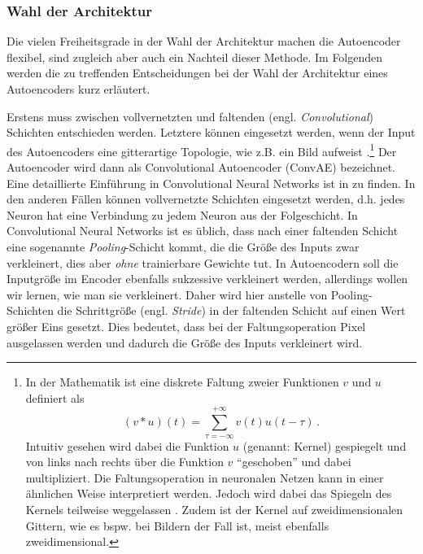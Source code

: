 \subsubsection{Wahl der Architektur}
\label{ch:MethodenDerDimRed:ML:AE:WahlArchitektur}

Die vielen Freiheitsgrade in der Wahl der Architektur machen die Autoencoder flexibel, sind
zugleich aber auch ein Nachteil dieser Methode. Im Folgenden werden die zu treffenden
Entscheidungen bei der Wahl der Architektur eines Autoencoders kurz erläutert.

Erstens muss zwischen vollvernetzten und faltenden (engl. \textit{Convolutional}) Schichten
entschieden werden. Letztere können eingesetzt werden, wenn der Input des Autoencoders eine
gitterartige Topologie, wie z.B. ein Bild aufweist \parencite[330]{Goodfellow.2016}.\footnote{In der Mathematik ist eine diskrete Faltung zweier
	Funktionen $v$ und $u$ definiert als
	\begin{equation*}
		(v * u)(t) = \sum_{\tau = -\infty}^{+\infty} v(t)u(t - \tau) \, .
	\end{equation*}
	Intuitiv gesehen wird dabei die Funktion $u$ (genannt: Kernel) gespiegelt und von links nach rechts über die Funktion $v$ \enquote{geschoben} und dabei multipliziert. Die Faltungsoperation in neuronalen Netzen kann in einer ähnlichen Weise interpretiert werden. Jedoch wird dabei das Spiegeln des Kernels teilweise weggelassen \parencite[333]{Goodfellow.2016}. Zudem ist der Kernel auf zweidimensionalen Gittern, wie es bspw. bei
	Bildern der Fall ist, meist ebenfalls zweidimensional.} Der Autoencoder wird dann als Convolutional
Autoencoder (ConvAE) bezeichnet. Eine detaillierte Einführung in Convolutional Neural Networks ist
in \textcite[330 -- 372]{Goodfellow.2016} zu finden. In den anderen Fällen können vollvernetzte
Schichten eingesetzt werden, d.h. jedes Neuron hat eine Verbindung zu jedem Neuron aus der
Folgeschicht. In Convolutional Neural Networks ist es üblich, dass nach einer faltenden Schicht
eine sogenannte \textit{Pooling}-Schicht \parencite[339 -- 345]{Goodfellow.2016} kommt, die die Größe des Inputs zwar verkleinert, dies aber
\textit{ohne} trainierbare Gewichte tut. In Autoencodern soll die Inputgröße im Encoder ebenfalls
sukzessive verkleinert werden, allerdings wollen wir lernen, wie man sie verkleinert. Daher wird
hier anstelle von Pooling-Schichten die Schrittgröße (engl. \textit{Stride}) in der faltenden
Schicht auf einen Wert größer Eins gesetzt. Dies bedeutet, dass bei der Faltungsoperation Pixel
ausgelassen werden und dadurch die Größe des Inputs verkleinert wird.

